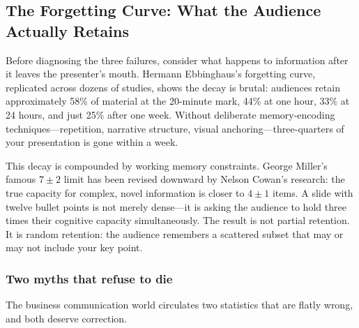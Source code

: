 \subsection{The Forgetting Curve: What the Audience Actually Retains}

Before diagnosing the three failures, consider what happens to information after it leaves the presenter's mouth. Hermann Ebbinghaus's forgetting curve, replicated across dozens of studies, shows the decay is brutal: audiences retain approximately 58\% of material at the 20-minute mark, 44\% at one hour, 33\% at 24 hours, and just 25\% after one week. Without deliberate memory-encoding techniques---repetition, narrative structure, visual anchoring---three-quarters of your presentation is gone within a week.

This decay is compounded by working memory constraints. George Miller's famous $7 \pm 2$ limit has been revised downward by Nelson Cowan's research: the true capacity for complex, novel information is closer to $4 \pm 1$ items. A slide with twelve bullet points is not merely dense---it is asking the audience to hold three times their cognitive capacity simultaneously. The result is not partial retention. It is random retention: the audience remembers a scattered subset that may or may not include your key point.

\subsubsection{Two myths that refuse to die}

The business communication world circulates two statistics that are flatly wrong, and both deserve correction.

